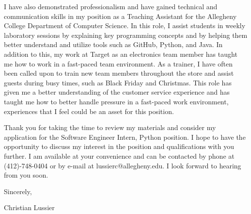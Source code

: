 \documentclass[10pt,a4paper]{altacv}
\begin{document}
\smallskip

I have also demonstrated professionalism and have gained technical and communication skills in my position as a Teaching Assistant for the Allegheny College Department of Computer Science. In this role, I assist students in weekly laboratory sessions by explaining key programming concepts and by helping them better understand and utilize tools such as GitHub, Python, and Java. In addition to this, my work at Target as an electronics team member has taught me how to work in a fast-paced team environment. As a trainer, I have often been called upon to train new team members throughout the store and assist guests during busy times, such as Black Friday and Christmas. This role has given me a better understanding of the customer service experience and has taught me how to better handle pressure in a fast-paced work environment, experiences that I feel could be an asset for this position.

\smallskip

Thank you for taking the time to review my materials and consider my application for the Software Engineer Intern, Python position. I hope to have the opportunity to discuss my interest in the position and qualifications with you further. I am available at your convenience and can be contacted by phone at (412)-748-0404 or by e-mail at lussierc@allegheny.edu. I look forward to hearing from you soon.

\bigbreak
Sincerely,

\medskip

Christian Lussier
\end{document}
